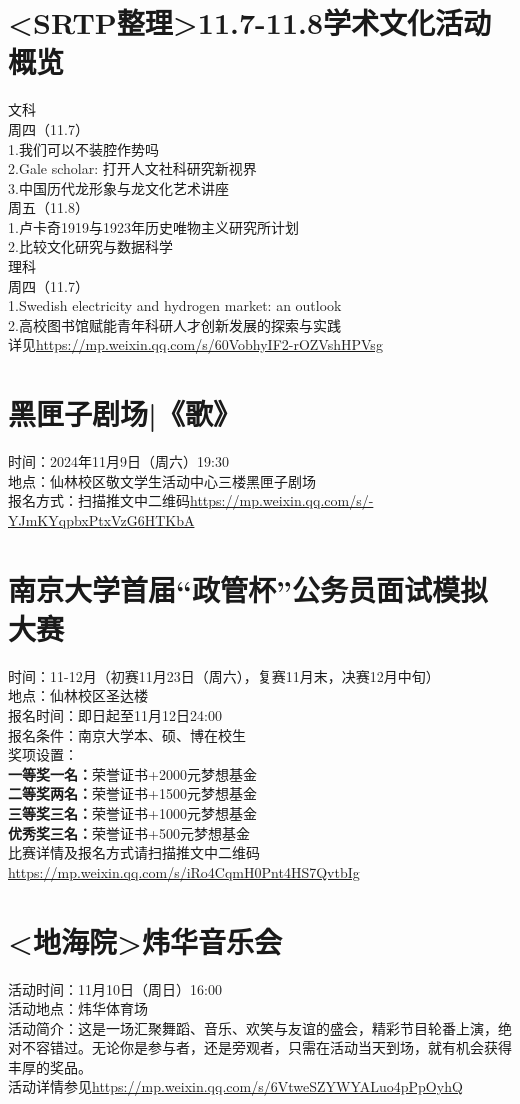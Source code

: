 \documentclass[letterpaper, 12pt]{article}
\begin{document}
\begin{multicols}{2}
\section{<SRTP整理>11.7-11.8学术文化活动概览}
文科\\
周四（11.7）\\
1.我们可以不装腔作势吗\\
2.Gale scholar: 打开人文社科研究新视界\\
3.中国历代龙形象与龙文化艺术讲座\\
周五（11.8）\\
1.卢卡奇1919与1923年历史唯物主义研究所计划\\
2.比较文化研究与数据科学\\
理科\\
周四（11.7）\\
1.Swedish electricity and hydrogen market: an outlook\\
2.高校图书馆赋能青年科研人才创新发展的探索与实践\\
详见\url{https://mp.weixin.qq.com/s/60VobhyIF2-rOZVshHPVsg}
\section{黑匣子剧场|《歌》}
时间：2024年11月9日（周六）19:30\\
地点：仙林校区敬文学生活动中心三楼黑匣子剧场\\
报名方式：扫描推文中二维码\url{https://mp.weixin.qq.com/s/-YJmKYqpbxPtxVzG6HTKbA}

\section{南京大学首届“政管杯”公务员面试模拟大赛}
时间：11-12月（初赛11月23日（周六），复赛11月末，决赛12月中旬）\\
地点：仙林校区圣达楼\\
报名时间：即日起至11月12日24:00\\
报名条件：南京大学本、硕、博在校生\\
奖项设置：\\
\textbf{一等奖一名：}荣誉证书+2000元梦想基金\\
\textbf{二等奖两名：}荣誉证书+1500元梦想基金\\
\textbf{三等奖三名：}荣誉证书+1000元梦想基金\\
\textbf{优秀奖三名：}荣誉证书+500元梦想基金\\
比赛详情及报名方式请扫描推文中二维码\url{https://mp.weixin.qq.com/s/iRo4CqmH0Pnt4HS7QvtbIg}

\section{<地海院>炜华音乐会}
活动时间：11月10日（周日）16:00\\
活动地点：炜华体育场\\
活动简介：这是一场汇聚舞蹈、音乐、欢笑与友谊的盛会，精彩节目轮番上演，绝对不容错过。无论你是参与者，还是旁观者，只需在活动当天到场，就有机会获得丰厚的奖品。\\
活动详情参见\url{https://mp.weixin.qq.com/s/6VtweSZYWYALuo4pPpOyhQ}\\
\end{multicols} 
\end{document}

